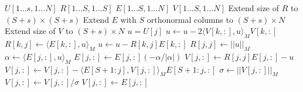 \begin{algorithmic}
\Require $U[1 \dots s, 1 \dots N]$ 
\Require $R[1 \dots S, 1 \dots S]$  
\Require $E[1 \dots S, 1 \dots N]$ 
\Require $V[1 \dots S, 1 \dots N]$ 
\State Extend size of $R$ to $(S + s) \times (S + s)$
\State Extend $E$ with $S$ orthonormal columns to $(S + s) \times N$
\State Extend size of $V$ to $(S + s) \times N$
    \State $u = U[j]$
        \State $u \leftarrow u - 2 \langle V[k, :], u \rangle_M V[k, :]$
        \State $R[k, j] \leftarrow \langle E[k, :], u \rangle_M$
        \State $u \leftarrow u - R[k, j] E[k, :]$
    \EndFor
    \State $R[j, j] \leftarrow ||u||_M$
    \State $\alpha \leftarrow \langle E[j, :], u \rangle_M$
        \State $E[j, :] \leftarrow E[j, :] (-\alpha / |\alpha|)$
    \EndIf 
    \State $V[j, :] \leftarrow R[j, j] E[j, :] - u$
    \State $V[j, :] \leftarrow V[j, :] - \langle E[S+1:j], V[j, :] \rangle_M E[S+1:j, :]$
    \State $\sigma \leftarrow ||V[j, :]||_M$
        \State $V[j, :] \leftarrow V[j, :] / \sigma$
    \Else
        \State$V[j, :] \leftarrow E[j, :]$
    \EndIf
\EndFor
\end{algorithmic}